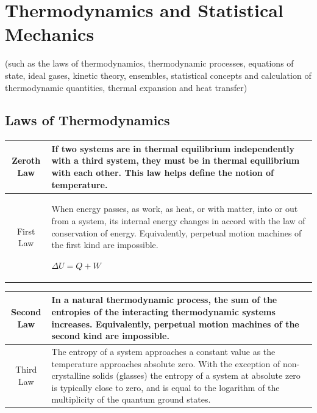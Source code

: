 

\section{Thermodynamics and Statistical Mechanics}
(such as the laws of thermodynamics, thermodynamic
processes, equations of state,
ideal gases, kinetic theory, ensembles,
statistical concepts and calculation of
thermodynamic quantities, thermal
expansion and heat transfer)

\subsection{Laws of Thermodynamics}
\center
\begin{tabular}{|c|p{12 cm}|}
\hline

Zeroth Law & If two systems are in thermal equilibrium independently with a third system, they must be in thermal equilibrium with each other. This law helps define the notion of temperature.
 
\\ \hline

First Law & When energy passes, as work, as heat, or with matter, into or out from a system, its internal energy changes in accord with the law of conservation of energy. Equivalently, perpetual motion machines of the first kind are impossible.

$\Delta U = Q + W$
  
 \\ \hline
 
\end{tabular}
\flushleft

\center
\begin{tabular}{|c|p{12 cm}|}
\hline

Second Law &  In a natural thermodynamic process, the sum of the entropies of the interacting thermodynamic systems increases. Equivalently, perpetual motion machines of the second kind are impossible.
  
\\ \hline

Third Law & The entropy of a system approaches a constant value as the temperature approaches absolute zero. With the exception of non-crystalline solids (glasses) the entropy of a system at absolute zero is typically close to zero, and is equal to the logarithm of the multiplicity of the quantum ground states.
 
 \\ \hline
 
\end{tabular}
\flushleft

